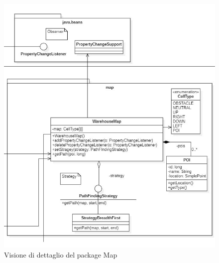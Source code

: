 \begin{figure}[H]
	\centering
	\includegraphics[scale=0.60]{res/diagrams/server/server_pack_map.jpg}
	\caption{Visione di dettaglio del package Map}
\end{figure}


